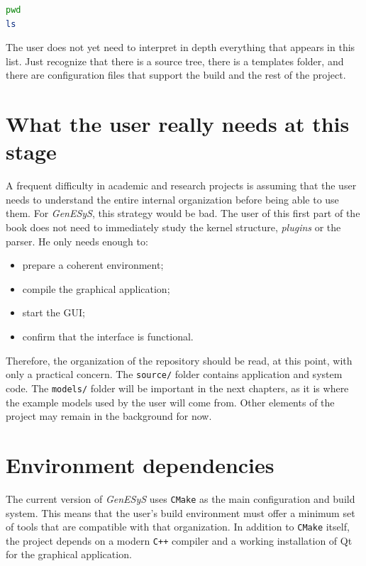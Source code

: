 \begin{lstlisting}[language=bash,caption={Initial Inspection of the Repository Root},label={lst:cap2_inspecao_inicial}]
pwd
ls
\end{lstlisting}

The user does not yet need to interpret in depth everything that appears in this list. Just recognize that there is a source tree, there is a templates folder, and there are configuration files that support the build and the rest of the project.

\section{What the user really needs at this stage}
\label{sec:cap2_o_que_usuario_precisa}

A frequent difficulty in academic and research projects is assuming that the user needs to understand the entire internal organization before being able to use them. For \textit{GenESyS}, this strategy would be bad. The user of this first part of the book does not need to immediately study the kernel structure, \textit{plugins} or the parser. He only needs enough to:
\begin{itemize}
\item prepare a coherent environment;
\item compile the graphical application;
\item start the GUI;
\item confirm that the interface is functional.
\end{itemize}

Therefore, the organization of the repository should be read, at this point, with only a practical concern. The \texttt{source/} folder contains application and system code. The \texttt{models/} folder will be important in the next chapters, as it is where the example models used by the user will come from. Other elements of the project may remain in the background for now.

\section{Environment dependencies}
\label{sec:cap2_dependencias_ambiente}

The current version of \textit{GenESyS} uses \texttt{CMake} as the main configuration and build system. This means that the user's build environment must offer a minimum set of tools that are compatible with that organization. In addition to \texttt{CMake} itself, the project depends on a modern \texttt{C++} compiler and a working installation of Qt for the graphical application.

